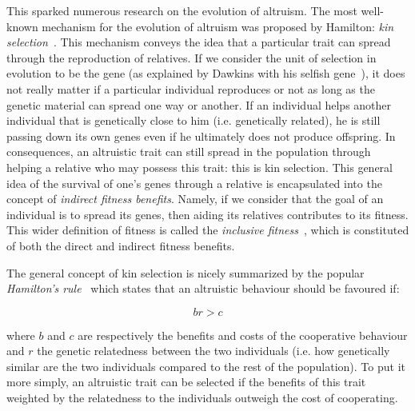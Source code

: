     This sparked numerous research on the evolution of altruism. The most well-known mechanism for the evolution of altruism was proposed by Hamilton: \emph{kin selection}~\parencite{Hamilton1964}. This mechanism conveys the idea that a particular trait can spread through the reproduction of relatives. If we consider the unit of selection in evolution to be the gene (as explained by Dawkins with his selfish gene~\parencite{Dawkins1976}), it does not really matter if a particular individual reproduces or not as long as the genetic material can spread one way or another. If an individual helps another individual that is genetically close to him (i.e. genetically related), he is still passing down its own genes even if he ultimately does not produce offspring. In consequences, an altruistic trait can still spread in the population through helping a relative who may possess this trait: this is kin selection. This general idea of the survival of one's genes through a relative is encapsulated into the concept of \emph{indirect fitness benefits}. Namely, if we consider that the goal of an individual is to spread its genes, then aiding its relatives contributes to its fitness. This wider definition of fitness is called the \emph{inclusive fitness}~\parencite{Grafen1984}, which is constituted of both the direct and indirect fitness benefits.

    The general concept of kin selection is nicely summarized by the popular \emph{Hamilton's rule}~\parencite{Hamilton1964} which states that an altruistic behaviour should be favoured if:

    \[br > c\]

    where $b$ and $c$ are respectively the benefits and costs of the cooperative behaviour and $r$ the genetic relatedness between the two individuals (i.e. how genetically similar are the two individuals compared to the rest of the population). To put it more simply, an altruistic trait can be selected if the benefits of this trait weighted by the relatedness to the individuals outweigh the cost of cooperating.


